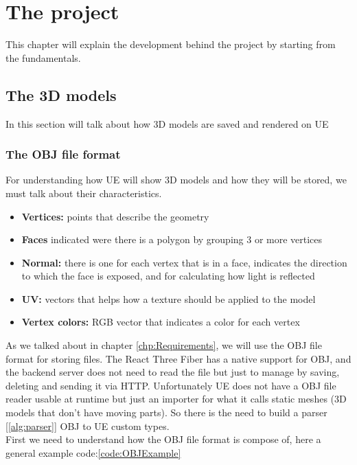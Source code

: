 
\chapter{The project}
\label{chp:project}
\noindent
This chapter will explain the development behind the project by starting from the fundamentals.
\section{The 3D models}
\noindent
In this section will talk about how 3D models are saved and rendered on \ac{UE}
\subsection{The OBJ file format}
\noindent
For understanding how \ac{UE} will show 3D models and how they will be stored, we must talk about their characteristics.

\begin{itemize}
    \item \textbf{Vertices:} points that describe the geometry
    \item \textbf{Faces} indicated were there is a polygon by grouping 3 or more vertices 
    \item \textbf{Normal:} there is one for each vertex that is in a face, indicates the direction to which the face is exposed, and for calculating how light is reflected
    \item \textbf{UV:} vectors that helps how a texture should be applied to the model
    \item \textbf{Vertex colors:} RGB vector that indicates a color for each vertex
\end{itemize}
\noindent
As we talked about in chapter \ref{chp:Requirements}, we will use the OBJ file format for storing files.
The React Three Fiber has a native support for OBJ, and the backend server does not need to read the file but just to manage by saving, deleting and sending it via \ac{HTTP}.
Unfortunately \ac{UE} does not have a OBJ file reader usable at runtime but just an importer for what it calls static meshes (3D models that don't have moving parts).
So there is the need to build a parser [\ref{alg:parser}] OBJ to \ac{UE} custom types.\\
First we need to understand how the OBJ file format is compose of, here a general example code:\ref{code:OBJExample}

